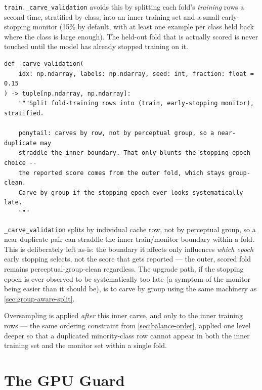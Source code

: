 \documentclass[11pt,a4paper,oneside]{report}
\newcommand{\code}[1]{\texttt{\small #1}}
\begin{document}
\code{train.\_carve\_validation} avoids this by splitting each fold's
\emph{training} rows a second time, stratified by class, into an inner
training set and a small early-stopping monitor (15\% by default, with at
least one example per class held back where the class is large enough). The
held-out fold that is actually scored is never touched until the model has
already stopped training on it.

\begin{lstlisting}[caption={The inner train/monitor split that keeps
early-stopping honest (\texttt{lxnet/train.py}).}, label=lst:carve]
def _carve_validation(
    idx: np.ndarray, labels: np.ndarray, seed: int, fraction: float = 0.15
) -> tuple[np.ndarray, np.ndarray]:
    """Split fold-training rows into (train, early-stopping monitor), stratified.

    ponytail: carves by row, not by perceptual group, so a near-duplicate may
    straddle the inner boundary. That only blunts the stopping-epoch choice --
    the reported score comes from the outer fold, which stays group-clean.
    Carve by group if the stopping epoch ever looks systematically late.
    """
\end{lstlisting}

\begin{debtbox}
\code{\_carve\_validation} splits by individual cache row, not by perceptual
group, so a near-duplicate pair can straddle the inner train/monitor boundary
within a fold. This is deliberately left as-is: the boundary it affects only
influences \emph{which epoch} early stopping selects, not the score that gets
reported --- the outer, scored fold remains perceptual-group-clean regardless.
The upgrade path, if the stopping epoch is ever observed to be systematically
too late (a symptom of the monitor being easier than it should be), is to
carve by group using the same machinery as \cref{sec:group-aware-split}.
\end{debtbox}

Oversampling is applied \emph{after} this inner carve, and only to the inner
training rows --- the same ordering constraint from
\cref{sec:balance-order}, applied one level deeper so that a duplicated
minority-class row cannot appear in both the inner training set and the
monitor set within a single fold.

\section{The GPU Guard}
\label{sec:gpu-guard}
\end{document}
